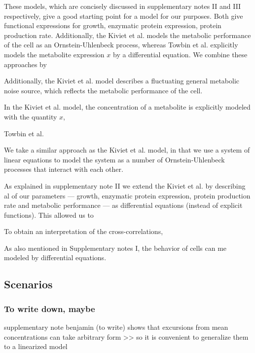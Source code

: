 %
These models, which are concisely discussed in supplementary notes II and III respectively, give a good starting point for a model for our purposes.
%
Both give functional expressions for growth, enzymatic protein expression, protein production rate. 
%
Additionally, the Kiviet et al. models the metabolic performance of the cell as an Ornstein-Uhlenbeck process,
whereas Towbin et al. explicitly models the metabolite expression $x$ by a differential equation.
%
We combine these approaches by 

Additionally, the Kiviet et al. model describes a fluctuating general metabolic noise source, which reflects the metabolic performance of the cell.
%


In the Kiviet et al. model, the concentration of a metabolite is explicitly modeled with the quantity $x$, 

Towbin et al.



We take a similar approach as the Kiviet et al. model, in that we use a system of linear equations to model the system as a number of Ornstein-Uhlenbeck processes that interact with each other.
%

%
As explained in supplementary note II we extend the Kiviet et al. by describing al of our parameters --- growth, enzymatic protein expression, protein production rate and metabolic performance --- as differential equations (instead of explicit functions).
%
This allowed us to 







To obtain an interpretation of the cross-correlations, 

As also mentioned in Supplementary notes I, the behavior of cells can me modeled by differential equations.
%



\subsection{Scenarios}


\subsubsection*{To write down, maybe}


supplementary note benjamin (to write) shows that excursions from mean concentrations can take arbitrary form
>> so it is convenient to generalize them to a linearized model


















